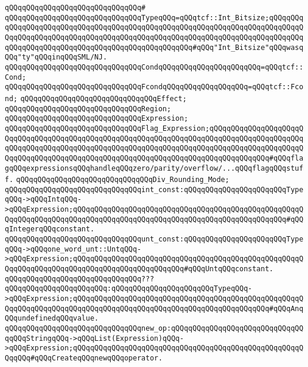 \verb|qQQqqQQqqQQqqQQqqQQqqQQqqQQqqQQq#|\newline
\verb|qQQqqQQqqQQqqQQqqQQqqQQqqQQqqQQqTypeqQQq=qQQqtcf::Int_Bitsize;qQQqqQQqqQQqqQQqqQQqqQQqqQQqqQQqqQQqqQQqqQQqqQQqqQQqqQQqqQQqqQQqqQQqqQQqqQQqqQQqqQQqqQQqqQQqqQQqqQQqqQQqqQQqqQQqqQQqqQQqqQQqqQQqqQQqqQQqqQQqqQQqqQQqqQQqqQQqqQQqqQQqqQQqqQQqqQQqqQQqqQQqqQQqqQQq#qQQq"Int_Bitsize"qQQqwasqQQq"ty"qQQqinqQQqSML/NJ.|\newline
\verb|qQQqqQQqqQQqqQQqqQQqqQQqqQQqqQQqCondqQQqqQQqqQQqqQQqqQQqqQQq=qQQqtcf::Cond;|\newline
\verb|qQQqqQQqqQQqqQQqqQQqqQQqqQQqqQQqFcondqQQqqQQqqQQqqQQqqQQq=qQQqtcf::Fcond;|\newline
\newline
\verb|qQQqqQQqqQQqqQQqqQQqqQQqqQQqqQQqEffect;|\newline
\verb|qQQqqQQqqQQqqQQqqQQqqQQqqQQqqQQqRegion;|\newline
\verb|qQQqqQQqqQQqqQQqqQQqqQQqqQQqqQQqExpression;|\newline
\verb|qQQqqQQqqQQqqQQqqQQqqQQqqQQqqQQqFlag_Expression;qQQqqQQqqQQqqQQqqQQqqQQqqQQqqQQqqQQqqQQqqQQqqQQqqQQqqQQqqQQqqQQqqQQqqQQqqQQqqQQqqQQqqQQqqQQqqQQqqQQqqQQqqQQqqQQqqQQqqQQqqQQqqQQqqQQqqQQqqQQqqQQqqQQqqQQqqQQqqQQqqQQqqQQqqQQqqQQqqQQqqQQqqQQqqQQqqQQqqQQqqQQqqQQqqQQqqQQqqQQqqQQq#qQQqflagqQQqexpressionsqQQqhandleqQQqzero/parity/overflow/...qQQqflagqQQqstuff.|\newline
\verb|qQQqqQQqqQQqqQQqqQQqqQQqqQQqqQQqDiv_Rounding_Mode;|\newline
\newline
\verb|qQQqqQQqqQQqqQQqqQQqqQQqqQQqqQQqint_const:qQQqqQQqqQQqqQQqqQQqqQQqTypeqQQq->qQQqIntqQQq->qQQqExpression;qQQqqQQqqQQqqQQqqQQqqQQqqQQqqQQqqQQqqQQqqQQqqQQqqQQqqQQqqQQqqQQqqQQqqQQqqQQqqQQqqQQqqQQqqQQqqQQqqQQqqQQqqQQqqQQqqQQqqQQq#qQQqIntegerqQQqconstant.|\newline
\verb|qQQqqQQqqQQqqQQqqQQqqQQqqQQqqQQqunt_const:qQQqqQQqqQQqqQQqqQQqqQQqTypeqQQq->qQQqone_word_unt::UntqQQq->qQQqExpression;qQQqqQQqqQQqqQQqqQQqqQQqqQQqqQQqqQQqqQQqqQQqqQQqqQQqqQQqqQQqqQQqqQQqqQQqqQQqqQQqqQQqqQQqqQQqqQQq#qQQqUntqQQqconstant.|\newline
\verb|qQQqqQQqqQQqqQQqqQQqqQQqqQQqqQQq???qQQqqQQqqQQqqQQqqQQqqQQq:qQQqqQQqqQQqqQQqqQQqqQQqTypeqQQq->qQQqExpression;qQQqqQQqqQQqqQQqqQQqqQQqqQQqqQQqqQQqqQQqqQQqqQQqqQQqqQQqqQQqqQQqqQQqqQQqqQQqqQQqqQQqqQQqqQQqqQQqqQQqqQQqqQQqqQQqqQQq#qQQqAnqQQqundefinedqQQqvalue.|\newline
\newline
\verb|qQQqqQQqqQQqqQQqqQQqqQQqqQQqqQQqnew_op:qQQqqQQqqQQqqQQqqQQqqQQqqQQqqQQqqQQqStringqQQq->qQQqList(Expression)qQQq->qQQqExpression;qQQqqQQqqQQqqQQqqQQqqQQqqQQqqQQqqQQqqQQqqQQqqQQqqQQqqQQqqQQq#qQQqCreateqQQqnewqQQqoperator.|\newline
